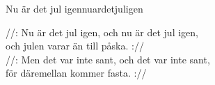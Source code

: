 \begin{song}{Nu är det jul igen}{nuardetjuligen}
\begin{vers}
//: Nu är det jul igen, och nu är det jul igen,\\
och julen varar än till påska. ://\\
//: Men det var inte sant, och det var inte sant,\\
för däremellan kommer fasta. ://\\
\end{vers}
\end{song}
